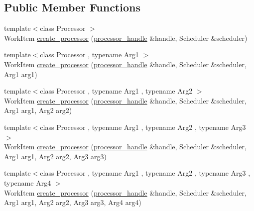 \subsection*{Public Member Functions}
\begin{DoxyCompactItemize}
\item 
{\footnotesize template$<$class Processor $>$ }\\Work\+Item \mbox{\hyperlink{classboost_1_1statechart_1_1processor__container_a1c0d4537b1980bfe72d6293e717e2ce1}{create\+\_\+processor}} (\mbox{\hyperlink{classboost_1_1statechart_1_1processor__container_a82ebbffaed81d7b99119ae0e892f6411}{processor\+\_\+handle}} \&handle, Scheduler \&scheduler)
\item 
{\footnotesize template$<$class Processor , typename Arg1 $>$ }\\Work\+Item \mbox{\hyperlink{classboost_1_1statechart_1_1processor__container_aaff8f2050ce75a6b39395677d1bca6b7}{create\+\_\+processor}} (\mbox{\hyperlink{classboost_1_1statechart_1_1processor__container_a82ebbffaed81d7b99119ae0e892f6411}{processor\+\_\+handle}} \&handle, Scheduler \&scheduler, Arg1 arg1)
\item 
{\footnotesize template$<$class Processor , typename Arg1 , typename Arg2 $>$ }\\Work\+Item \mbox{\hyperlink{classboost_1_1statechart_1_1processor__container_a223cc5302da135270a30d69739efb0dd}{create\+\_\+processor}} (\mbox{\hyperlink{classboost_1_1statechart_1_1processor__container_a82ebbffaed81d7b99119ae0e892f6411}{processor\+\_\+handle}} \&handle, Scheduler \&scheduler, Arg1 arg1, Arg2 arg2)
\item 
{\footnotesize template$<$class Processor , typename Arg1 , typename Arg2 , typename Arg3 $>$ }\\Work\+Item \mbox{\hyperlink{classboost_1_1statechart_1_1processor__container_ae6f1aee0d18c8cb6f1558b830d2ab573}{create\+\_\+processor}} (\mbox{\hyperlink{classboost_1_1statechart_1_1processor__container_a82ebbffaed81d7b99119ae0e892f6411}{processor\+\_\+handle}} \&handle, Scheduler \&scheduler, Arg1 arg1, Arg2 arg2, Arg3 arg3)
\item 
{\footnotesize template$<$class Processor , typename Arg1 , typename Arg2 , typename Arg3 , typename Arg4 $>$ }\\Work\+Item \mbox{\hyperlink{classboost_1_1statechart_1_1processor__container_a6ee0545652d45cff1d1d04f7d4323144}{create\+\_\+processor}} (\mbox{\hyperlink{classboost_1_1statechart_1_1processor__container_a82ebbffaed81d7b99119ae0e892f6411}{processor\+\_\+handle}} \&handle, Scheduler \&scheduler, Arg1 arg1, Arg2 arg2, Arg3 arg3, Arg4 arg4)

\end{DoxyCompactItemize}

